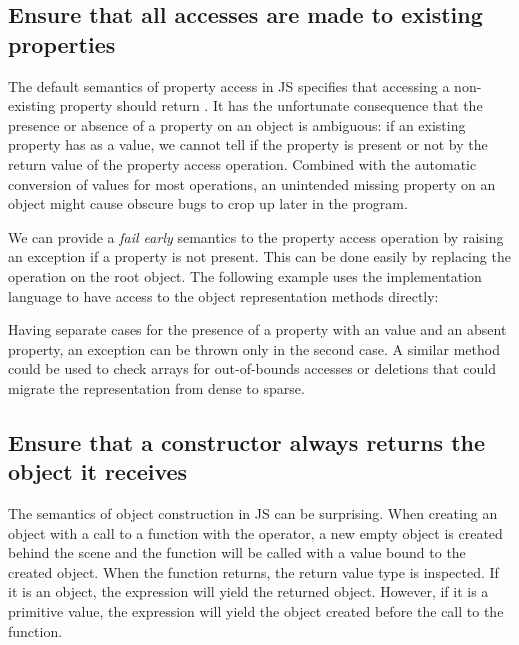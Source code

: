 \subsection{Ensure that all accesses are made to existing properties}

The default semantics of property access in JS specifies that accessing
a non-existing property should return . It has the unfortunate
consequence that the presence or absence of a property on an object is
ambiguous: if an existing property has  as a value, we cannot
tell if the property is present or not by the return value of the property
access operation. Combined with the automatic conversion of values for most
operations, an unintended missing property on an object might cause obscure
bugs to crop up later in the program.

We can provide a \textit{fail early} semantics to the property access operation
by raising an exception if a property is not present. This can be done easily
by replacing the  operation on the root object. The following
example uses the implementation language to have access to the object
representation methods directly:




Having separate cases for the presence of a property with an 
value and an absent property, an exception can be thrown only in the second
case. A similar method could be used to check arrays for out-of-bounds accesses
or deletions that could migrate the representation from dense to sparse.

\subsection{Ensure that a constructor always returns the object it receives}

The semantics of object construction in JS can be surprising. When creating an
object with a call to a function with the  operator, a new empty object
is created behind the scene and the function will be called with a 
value bound to the created object. When the function returns, the return value type 
is inspected. If it is an object, the  expression will yield the
returned object. However, if it is a primitive value, the  expression
will yield the object created before the call to the function.

